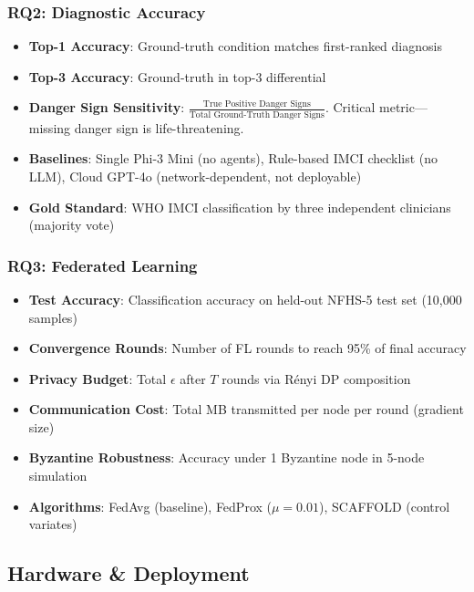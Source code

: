 \documentclass[conference,compsoc]{IEEEtran}
\begin{document}
\subsubsection{RQ2: Diagnostic Accuracy}
\begin{itemize}
    \item \textbf{Top-1 Accuracy}: Ground-truth condition matches first-ranked diagnosis
    \item \textbf{Top-3 Accuracy}: Ground-truth in top-3 differential
    \item \textbf{Danger Sign Sensitivity}: \(\frac{\text{True Positive Danger Signs}}{\text{Total Ground-Truth Danger Signs}}\). Critical metric—missing danger sign is life-threatening.
    \item \textbf{Baselines}: Single Phi-3 Mini (no agents), Rule-based IMCI checklist (no LLM), Cloud GPT-4o (network-dependent, not deployable)
    \item \textbf{Gold Standard}: WHO IMCI classification by three independent clinicians (majority vote)
\end{itemize}

\subsubsection{RQ3: Federated Learning}
\begin{itemize}
    \item \textbf{Test Accuracy}: Classification accuracy on held-out NFHS-5 test set (10,000 samples)
    \item \textbf{Convergence Rounds}: Number of FL rounds to reach 95\% of final accuracy
    \item \textbf{Privacy Budget}: Total \(\epsilon\) after \(T\) rounds via Rényi DP composition \cite{renyi_dp}
    \item \textbf{Communication Cost}: Total MB transmitted per node per round (gradient size)
    \item \textbf{Byzantine Robustness}: Accuracy under 1 Byzantine node in 5-node simulation
    \item \textbf{Algorithms}: FedAvg (baseline), FedProx (\(\mu=0.01\)), SCAFFOLD (control variates)
\end{itemize}

\subsection{Hardware \& Deployment}
\end{document}
